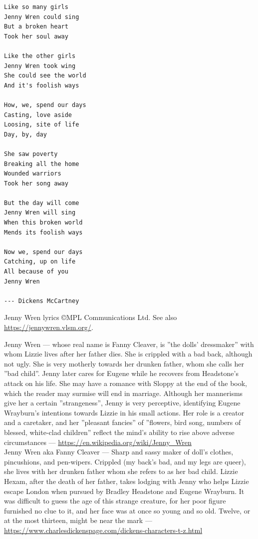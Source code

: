 \documentclass[12pt]{book}
\begin{document}
\begin{verbatim}
Like so many girls
Jenny Wren could sing
But a broken heart
Took her soul away

Like the other girls
Jenny Wren took wing
She could see the world
And it's foolish ways

How, we, spend our days
Casting, love aside
Loosing, site of life
Day, by, day

She saw poverty
Breaking all the home
Wounded warriors
Took her song away

But the day will come
Jenny Wren will sing
When this broken world
Mends its foolish ways

Now we, spend our days
Catching, up on life
All because of you
Jenny Wren

--- Dickens McCartney
\end{verbatim}

\noindent
Jenny Wren lyrics \copyright MPL Communications Ltd. See also \url{https://jennywren.vlsm.org/}.
\newpage

\noindent
Jenny Wren --- whose real name is Fanny Cleaver,
is ''the dolls' dressmaker'' with whom Lizzie lives after her father dies.
She is crippled with a bad back, although not ugly.
She is very motherly towards her drunken father, whom she calls her ''bad child''.
Jenny later cares for Eugene while he recovers from Headstone's attack on his life.
She may have a romance with Sloppy at the end of the book,
which the reader may surmise will end in marriage.
Although her mannerisms give her a certain ''strangeness'', Jenny is very perceptive,
identifying Eugene Wrayburn's intentions towards Lizzie in his small actions.
Her role is a creator and a caretaker, 
and her ''pleasant fancies'' of ''flowers, bird song, numbers of blessed, 
white-clad children'' reflect the mind's ability to rise above adverse 
circumstances --- \url{https://en.wikipedia.org/wiki/Jenny_Wren}
\\[1pt]

\noindent
Jenny Wren aka Fanny Cleaver --- Sharp and sassy maker of doll's clothes, 
pincushions, and pen-wipers. 
Crippled (my back’s bad, and my legs are queer),
she lives with her drunken father whom she refers to as her bad child.
Lizzie Hexam, after the death of her father,
takes lodging with Jenny who helps Lizzie escape London when pursued by Bradley Headstone and Eugene Wrayburn.
It was difficult to guess the age of this strange creature,
for her poor figure furnished no clue to it,
and her face was at once so young and so old. Twelve,
or at the most thirteen, might be near the mark --- 
\url{https://www.charlesdickenspage.com/dickens-characters-t-z.html}
\\[1pt]
\end{document}
